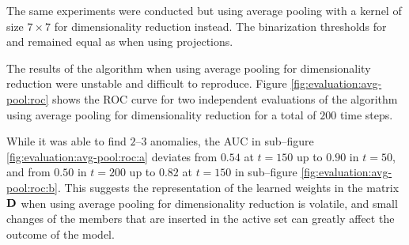
The same experiments were conducted but using average pooling with a kernel of size $7 \times 7$ for dimensionality reduction instead. The binarization thresholds for \usno and \panstarrs remained equal as when using projections. \newline

The results of the \mlblink algorithm when using average pooling for dimensionality reduction were unstable and difficult to reproduce. Figure \ref{fig:evaluation:avg-pool:roc} shows the ROC curve for two independent evaluations of the \mlblink algorithm using average pooling for dimensionality reduction for a total of $200$ time steps. \newline

While it was able to find $2$--$3$ anomalies, the AUC in sub--figure \ref{fig:evaluation:avg-pool:roc:a} deviates from $0.54$ at $t = 150$ up to $0.90$ in $t = 50$, and from $0.50$ in $t = 200$ up to $0.82$ at $t = 150$ in sub--figure \ref{fig:evaluation:avg-pool:roc:b}. This suggests the representation of the learned weights in the matrix $\boldsymbol{\mathbf{D}}$ when using average pooling for dimensionality reduction is volatile, and small changes of the members that are inserted in the active set can greatly affect the outcome of the model.


